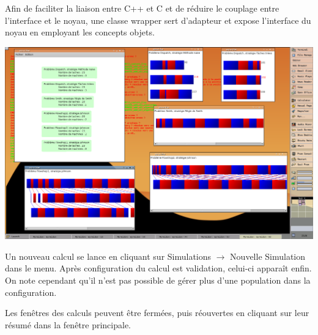 Afin de faciliter la liaison entre C++ et C et de réduire le couplage entre
l'interface et le noyau, une classe wrapper sert d'adapteur et expose
l'interface du noyau en employant les concepts objets.
\begin{center}
\includegraphics{myrmidon.png}
\end{center}
Un nouveau calcul se lance en cliquant sur Simulations $\rightarrow$ Nouvelle
Simulation dans le menu. Après configuration du calcul est validation, celui-ci
apparaît enfin. On note cependant qu'il n'est pas possible de gérer plus d'une
population dans la configuration.

Les fenêtres des calculs peuvent être fermées, puis réouvertes en cliquant sur leur résumé dans la fenêtre principale.

